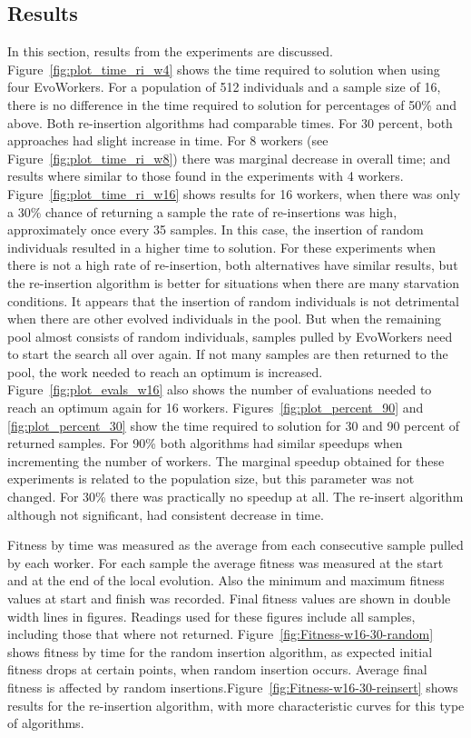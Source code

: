 \documentclass{llncs}
\begin{document}
\subsection{Results}
In this section, results from the experiments are discussed. 
Figure~\ref{fig:plot_time_ri_w4} shows the time required 
to solution when using four EvoWorkers. For a population of
512 individuals and a sample size of 16, there is no
difference in the time required to solution for 
percentages of 50\% and above. Both re-insertion algorithms
had comparable times. For 30 percent, both approaches 
had slight increase in time. For 8 workers 
(see Figure~\ref{fig:plot_time_ri_w8})  there was marginal
decrease in overall time; and results where 
similar to those found in the experiments with 4 workers.  
Figure~\ref{fig:plot_time_ri_w16} shows results for 16 workers,
when there was only a 30\% chance of returning a sample 
the rate of re-insertions was high, approximately once every 35
samples. In this case, the insertion of random individuals 
resulted in a higher time to solution. For these experiments
when there is not a high rate of re-insertion, both alternatives
have similar results, but the re-insertion algorithm is better
for situations when there are many starvation conditions. It appears
that the insertion of random individuals is not detrimental when there
are other evolved individuals in the pool. But when the remaining
pool almost consists of random individuals, samples pulled by
EvoWorkers need to start the search all over again. 
If not many samples are then returned to the pool, the work needed to reach an
optimum is increased. Figure~\ref{fig:plot_evals_w16} also shows the number 
of evaluations needed to reach an optimum again for 16 workers.
Figures~\ref{fig:plot_percent_90} and \ref{fig:plot_percent_30} show
the time required to solution for 30 and 90 percent of returned samples.
For 90\% both algorithms had similar speedups when incrementing the number of
workers. The marginal speedup obtained for these experiments is related to 
the population size, but this parameter was not changed. For 30\% 
there was practically no speedup at all. The re-insert algorithm
although not significant, had consistent decrease in time.         

Fitness by time was measured as the average from each consecutive
sample pulled by each worker. For each sample the average fitness
was measured at the start and at the end of the local evolution.
Also the minimum and maximum fitness values at start and finish was 
recorded. Final fitness values are shown in double width lines in figures.
Readings used for these figures include all samples, including
those that where not returned.   
Figure~\ref{fig:Fitness-w16-30-random} shows fitness by time
for the random insertion algorithm, as expected initial fitness drops
at certain points, when random insertion occurs. Average final fitness 
is affected by random insertions.Figure~\ref{fig:Fitness-w16-30-reinsert}
shows results for the re-insertion algorithm, with more
characteristic curves for this type of algorithms. 
 
\end{document}
